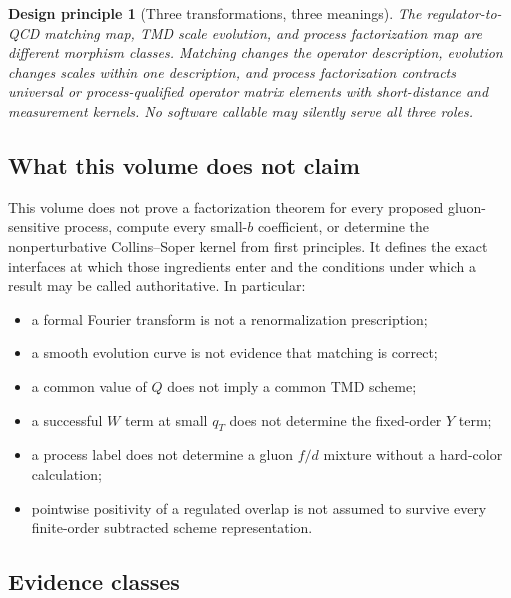 \documentclass[11pt]{article}
\newtheorem{principle}[definition]{Design principle}
\begin{document}
\begin{principle}[Three transformations, three meanings]
The regulator-to-QCD matching map, TMD scale evolution, and process
factorization map are different morphism classes.  Matching changes the
operator description, evolution changes scales within one description, and
process factorization contracts universal or process-qualified operator
matrix elements with short-distance and measurement kernels.  No software
callable may silently serve all three roles.
\end{principle}

\subsection{What this volume does not claim}

This volume does not prove a factorization theorem for every proposed
gluon-sensitive process, compute every small-\(b\) coefficient, or determine
the nonperturbative Collins--Soper kernel from first principles.  It defines
the exact interfaces at which those ingredients enter and the conditions
under which a result may be called authoritative.  In particular:
\begin{itemize}
\item a formal Fourier transform is not a renormalization prescription;
\item a smooth evolution curve is not evidence that matching is correct;
\item a common value of \(Q\) does not imply a common TMD scheme;
\item a successful \(W\) term at small \(q_T\) does not determine the
      fixed-order \(Y\) term;
\item a process label does not determine a gluon \(f/d\) mixture without a
      hard-color calculation;
\item pointwise positivity of a regulated overlap is not assumed to survive
      every finite-order subtracted scheme representation.
\end{itemize}

\subsection{Evidence classes}
\end{document}
